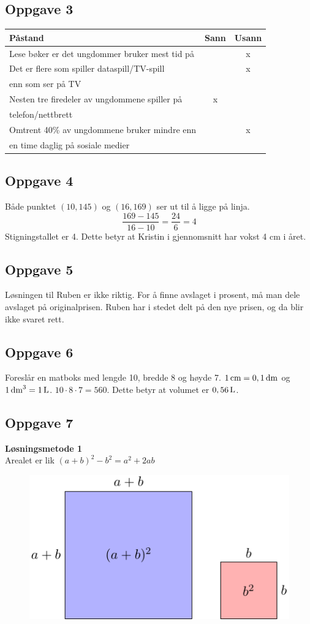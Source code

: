\subsection*{Oppgave 3}
\begin{tabular}{l|c|c}
\textbf{Påstand} & \textbf{Sann} & \textbf{Usann} \\ \hline
Lese bøker er det ungdommer bruker mest tid på & & x	\\ \hline 
Det er flere som spiller dataspill/TV-spill & & x \\ 
enn som ser på TV & &\\ \hline
Nesten tre firedeler av ungdommene spiller på & x & \\
telefon/nettbrett& &\\ \hline
Omtrent 40\% av ungdommene bruker mindre enn & & x \\
en time daglig på sosiale medier & &
\end{tabular}


\subsection*{Oppgave 4}
Både punktet $ (10, 145) $ og $ (16, 169) $ ser ut til å ligge på linja.
\[ \frac{169-145}{16-10}=\frac{24}{6}=4 \]
Stigningstallet er 4. Dette betyr at Kristin i gjennomsnitt har vokst 4 cm i året.

\subsection*{Oppgave 5}
Løsningen til Ruben er ikke riktig. For å finne avslaget i prosent, må man dele avslaget på originalprisen. Ruben har i stedet delt på den nye prisen, og da blir ikke svaret rett.

\subsection*{Oppgave 6}
Foreslår en matboks med lengde 10, bredde 8 og høyde 7. $ 1\,\textrm{cm}=0,1\,\textrm{dm} $ og $ 1\,\textrm{dm}^3=1\,\textrm{L} $. $ 10\cdot8\cdot7=560 $. Dette betyr at volumet er $ 0,56\,\textrm{L} $.

\newpage
\subsection*{Oppgave 7}
\textbf{Løsningsmetode 1} \\
Arealet er lik $ (a+b)^2-b^2=a^2+2ab $
\begin{figure}
	\includegraphics[]{opg7d1_a}
\end{figure}

